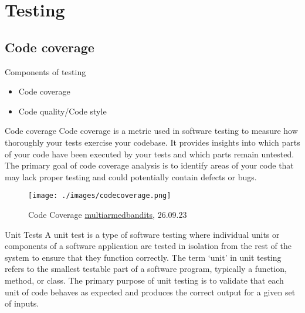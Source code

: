 \section{Testing}
\subsection{Code coverage}
\begin{frame}
    \begin{content}{Components of testing}
        \begin{itemize}
            \item Code coverage
            \item Code quality/Code style
        \end{itemize}
    \end{content}
\end{frame}
\begin{frame}
    \begin{content}{Code coverage}
        Code coverage is a metric used in software testing to measure how thoroughly your tests exercise your codebase. It provides insights into which parts of your code have been executed by your tests and which parts remain untested. The primary goal of code coverage analysis is to identify areas of your code that may lack proper testing and could potentially contain defects or bugs.
    \end{content}
\end{frame}
\begin{frame}
    \begin{figure}    
        \texttt{[image: ./images/codecoverage.png]}
        \caption{Code Coverage \href{https://gitlab.com/aferdina/MultiArmedBandits}{multiarmedbandits}, 26.09.23} 
    \end{figure}
\end{frame}
\begin{frame}
    \begin{content}{Unit Tests}
        A unit test is a type of software testing where individual units or components of a software application are tested in isolation from the rest of the system to ensure that they function correctly. The term `unit' in unit testing refers to the smallest testable part of a software program, typically a function, method, or class. The primary purpose of unit testing is to validate that each unit of code behaves as expected and produces the correct output for a given set of inputs.
    \end{content}
\end{frame}

